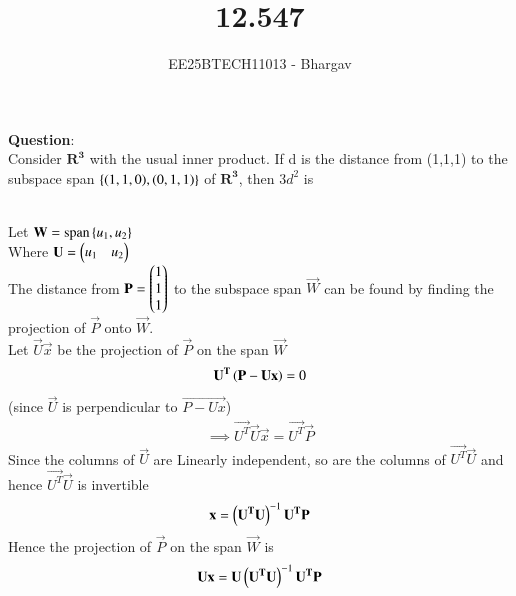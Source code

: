 \documentclass[journal]{IEEEtran}
\begin{document}

\vspace{3cm}

\title{12.547}
\author{EE25BTECH11013 - Bhargav}
\maketitle
    {\let\newpage\relax\maketitle}

\renewcommand{\thefigure}{\theenumi}
\renewcommand{\thetable}{\theenumi}
\setlength{\intextsep}{10pt} %

\renewcommand{\thetable}{\theenumi}

\textbf{Question}: \\
Consider $\mathbf{R^3}$ with the usual inner product. If d  is the distance from (1,1,1) to the subspace span $\left\{(1,1,0), (0,1,1)\right\}$ of $\mathbf{R^3}$, then $3d^2$ is

\solution \\
Let
$\mathbf{W} = \operatorname{span}\left\{u_1, u_2\right\}$\\
Where $\mathbf{U} = \begin{pmatrix}u_1 & u_2\end{pmatrix}$ \\

The distance from $\mathbf{P} = \begin{pmatrix}1 \\ 1 \\ 1\end{pmatrix}$ to the subspace span $\vec{W}$ can be found by finding the projection of $\vec{P}$ onto $\vec{W}$.\\
Let $\vec{U}\vec{x}$ be the projection of $\vec{P}$ on the span $\vec{W}$
\begin{align}
\mathbf{U^T}\left(\mathbf{P-Ux}\right)=0
\end{align}
(since $\vec{U}$ is perpendicular to $\vec{P-Ux}$)
\begin{align}
\implies \vec{U^T}\vec{U}\vec{x} = \vec{U^T}\vec{P}
\end{align}
Since the columns of $\vec{U}$ are Linearly independent, so are the columns of $\vec{U^T}\vec{U}$ and hence $\vec{U^T}\vec{U}$ is invertible 
\begin{align}
\mathbf{x} = \left(\mathbf{U^T}\mathbf{U}\right)^{-1} \mathbf{U^T}\mathbf{P}
\end{align}
Hence the projection of $\vec{P}$ on the span $\vec{W}$ is
\begin{align}
\mathbf{U}\mathbf{x} = \mathbf{U}\left(\mathbf{U^T}\mathbf{U}\right)^{-1} \mathbf{U^T}\mathbf{P}
\end{align}
\end{document}
